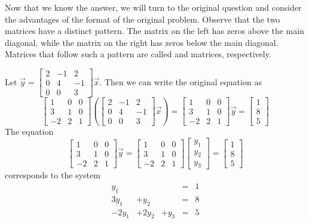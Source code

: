 \documentclass{ximera}
\begin{document}
\begin{exploration}
Now that we know the answer, we will turn to the original question and consider the advantages of the format of the original problem.  Observe that the two matrices have a distinct pattern.  The matrix on the left has zeros above the main diagonal, while the matrix on the right has zeros below the main diagonal.  Matrices that follow such a pattern are called  and  matrices, respectively.

Let $\vec{y}=\begin{bmatrix}2&-1&2\\0&4&-1\\0&0&3\end{bmatrix}\vec{x}$.  Then we can write the original equation as
$$\begin{bmatrix}1&0&0\\3&1&0\\-2&2&1\end{bmatrix}\left(\begin{bmatrix}2&-1&2\\0&4&-1\\0&0&3\end{bmatrix}\vec{x}\right)=\begin{bmatrix}1&0&0\\3&1&0\\-2&2&1\end{bmatrix}\vec{y}=\begin{bmatrix}1\\8\\5\end{bmatrix}$$
The equation 
$$\begin{bmatrix}1&0&0\\3&1&0\\-2&2&1\end{bmatrix}\vec{y}=\begin{bmatrix}1&0&0\\3&1&0\\-2&2&1\end{bmatrix}\begin{bmatrix}y_1\\y_2\\y_3\end{bmatrix}=\begin{bmatrix}1\\8\\5\end{bmatrix}$$ 
corresponds to the system
$$\begin{matrix}
	 y_1&&&=&1\\
	   3y_1 & +y_2&&= &8 \\
      -2y_1&+2y_2&+y_3&=&5
    \end{matrix}$$
    

\end{exploration}
\end{document}
